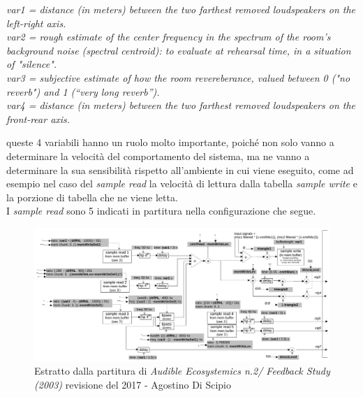\begin{center}
    \vspace{0.5cm}
    \textit{var1 = distance (in meters) between the two farthest removed loudspeakers on the left-right axis.} \\
    \textit{var2 = rough estimate of the center frequency in the spectrum of the room’s background noise (spectral centroid): to evaluate at rehearsal time, in a situation of "silence".} \\
    \textit{var3 = subjective estimate of how the room revereberance, valued between 0 ("no reverb") and 1 (“very long reverb”).} \\
    \textit{var4 = distance (in meters) between the two farthest removed loudspeakers on the front-rear axis.}
    \vspace{0.5cm}
\end{center}

queste 4 variabili hanno un ruolo molto importante, poiché non solo vanno a determinare la velocità del
comportamento del sistema, ma ne vanno a determinare la sua sensibilità rispetto all'ambiente in cui viene 
eseguito, come ad esempio nel caso del \textit{sample read} la velocità di lettura dalla tabella \textit{sample write} 
e la porzione di tabella che ne viene letta. \\
I \textit{sample read} sono 5 indicati in partitura nella configurazione che segue.

\begin{figure}[h!]
\begin{center}
\includegraphics[width=14cm]{figures/SAMPLERSFeedbackstudy2017.pdf}
\caption{Estratto dalla partitura di \textit{Audible Ecosystemics n.2/ Feedback Study (2003)}
revisione del 2017 - Agostino Di Scipio} 
\vspace{0.5cm}
\end{center}
\end{figure} 

